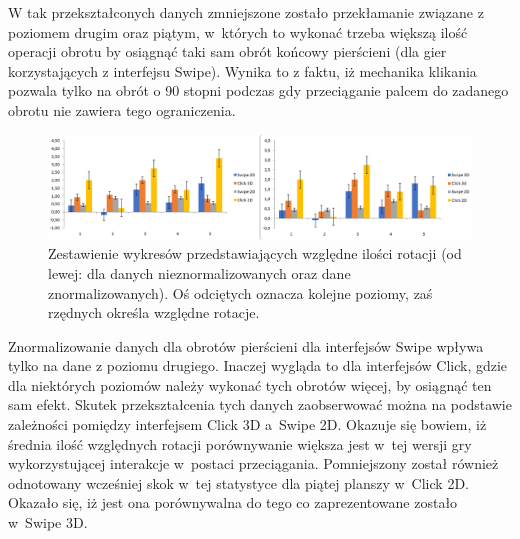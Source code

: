 \documentclass[a4paper,12pt,numbers=noenddot]{report}
\begin{document}
W tak przekształconych danych zmniejszone zostało przekłamanie związane z poziomem drugim oraz piątym, w~których to wykonać trzeba większą ilość operacji obrotu by osiągnąć taki sam obrót końcowy pierścieni (dla gier korzystających z interfejsu Swipe). Wynika to z faktu, iż mechanika klikania pozwala tylko na obrót o 90 stopni podczas gdy przeciąganie palcem do zadanego obrotu nie zawiera tego ograniczenia. 

\begin{figure}[h!]
	\centering
  	\includegraphics[width=\linewidth]{diag/rel_mean_rotationsNorm.png}
	\caption{Zestawienie wykresów przedstawiających względne ilości rotacji (od lewej: dla danych nieznormalizowanych oraz dane znormalizowanych). Oś odciętych oznacza kolejne poziomy, zaś rzędnych określa względne rotacje.}
	\label{fig:diag:rel:mean_RotationsNorm}
\end{figure}

Znormalizowanie danych dla obrotów pierścieni dla interfejsów Swipe wpływa tylko na dane z poziomu drugiego. Inaczej wygląda to dla interfejsów Click, gdzie dla niektórych poziomów należy wykonać tych obrotów więcej, by osiągnąć ten sam efekt. Skutek przekształcenia tych danych zaobserwować można na podstawie zależności pomiędzy interfejsem Click 3D a~Swipe 2D. Okazuje się bowiem, iż średnia ilość względnych rotacji porównywanie większa jest w~tej wersji gry wykorzystującej interakcje w~postaci przeciągania. Pomniejszony został również odnotowany wcześniej skok w~tej statystyce dla piątej planszy w~Click 2D. Okazało się, iż jest ona porównywalna do tego co zaprezentowane zostało w~Swipe 3D.
\end{document}
